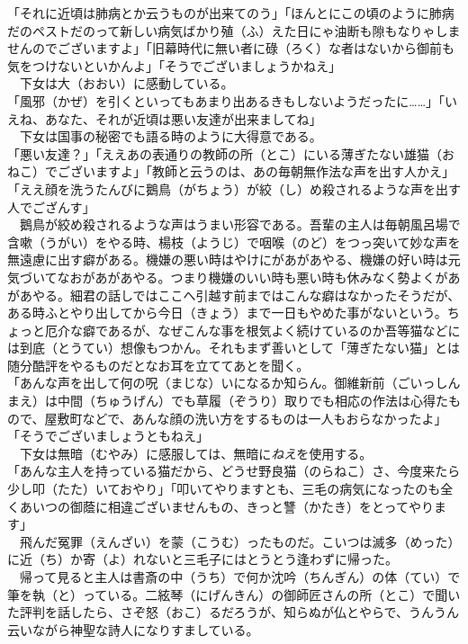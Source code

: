 「それに近頃は肺病とか云うものが出来てのう」「ほんとにこの頃のように肺病だのペストだのって新しい病気ばかり殖（ふ）えた日にゃ油断も隙もなりゃしませんのでございますよ」「旧幕時代に無い者に碌（ろく）な者はないから御前も気をつけないといかんよ」「そうでございましょうかねえ」\\
　下女は大（おおい）に感動している。\\
「風邪（かぜ）を引くといってもあまり出あるきもしないようだったに\ldots{}\ldots{}」「いえね、あなた、それが近頃は悪い友達が出来ましてね」\\
　下女は国事の秘密でも語る時のように大得意である。\\
「悪い友達？」「ええあの表通りの教師の所（とこ）にいる薄ぎたない雄猫（おねこ）でございますよ」「教師と云うのは、あの毎朝無作法な声を出す人かえ」「ええ顔を洗うたんびに鵝鳥（がちょう）が絞（し）め殺されるような声を出す人でござんす」\\
　鵝鳥が絞め殺されるような声はうまい形容である。吾輩の主人は毎朝風呂場で含嗽（うがい）をやる時、楊枝（ようじ）で咽喉（のど）をつっ突いて妙な声を無遠慮に出す癖がある。機嫌の悪い時はやけにがあがあやる、機嫌の好い時は元気づいてなおがあがあやる。つまり機嫌のいい時も悪い時も休みなく勢よくがあがあやる。細君の話しではここへ引越す前まではこんな癖はなかったそうだが、ある時ふとやり出してから今日（きょう）まで一日もやめた事がないという。ちょっと厄介な癖であるが、なぜこんな事を根気よく続けているのか吾等猫などには到底（とうてい）想像もつかん。それもまず善いとして「薄ぎたない猫」とは随分酷評をやるものだとなお耳を立ててあとを聞く。\\
「あんな声を出して何の呪（まじな）いになるか知らん。御維新前（ごいっしんまえ）は中間（ちゅうげん）でも草履（ぞうり）取りでも相応の作法は心得たもので、屋敷町などで、あんな顔の洗い方をするものは一人もおらなかったよ」「そうでございましょうともねえ」\\
　下女は無暗（むやみ）に感服しては、無暗に\emph{ねえ}を使用する。\\
「あんな主人を持っている猫だから、どうせ野良猫（のらねこ）さ、今度来たら少し叩（たた）いておやり」「叩いてやりますとも、三毛の病気になったのも全くあいつの御蔭に相違ございませんもの、きっと讐（かたき）をとってやります」\\
　飛んだ冤罪（えんざい）を蒙（こうむ）ったものだ。こいつは滅多（めった）に近（ち）か寄（よ）れないと三毛子にはとうとう逢わずに帰った。\\
　帰って見ると主人は書斎の中（うち）で何か沈吟（ちんぎん）の体（てい）で筆を執（と）っている。二絃琴（にげんきん）の御師匠さんの所（とこ）で聞いた評判を話したら、さぞ怒（おこ）るだろうが、知らぬが仏とやらで、うんうん云いながら神聖な詩人になりすましている。\\
